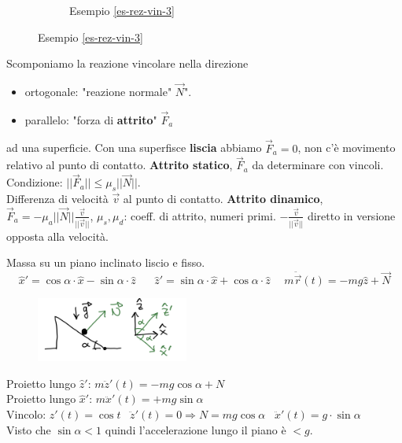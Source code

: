 \begin{figure}[h!]
\begin{subfigure}[b]{0.25\textwidth}
        \caption*{Esempio \ref{es-rez-vin-3}}
    \end{subfigure}
\end{figure}
\hspace{-15pt}Scomponiamo la reazione vincolare nella direzione
\begin{itemize}
    \item ortogonale: "reazione normale" $\vec{N}$".
    \item parallelo: "forza di \textbf{attrito}" $\vec{F}_a$
\end{itemize}
ad una superficie. Con una superfisce \textbf{liscia} abbiamo $\vec{F}_a = 0$, non c'è
movimento relativo al punto di contatto. \textbf{Attrito statico}, $\vec{F}_a$ da determinare con vincoli. Condizione: $||\vec{F}_a|| \leq \mu_s ||\vec{N}||$.\\
Differenza di velocità $\vec{v}$ al punto di contatto. \textbf{Attrito dinamico}, $\vec{F}_a = -\mu_a ||\vec{N}||\frac{\vec{v}}{||\vec{v}||}$, $\mu_s, \mu_d$: coeff. di attrito, numeri primi.
$-\frac{\vec{v}}{||\vec{v}||}$ diretto in versione opposta alla velocità.

\begin{example}
    Massa su un piano inclinato liscio e fisso.
    $$\hat{x}' = \cos\alpha \cdot \hat{x} - \sin\alpha \cdot \hat{z} \hspace{20pt}\hat{z}' = \sin\alpha \cdot \hat{x} + \cos\alpha \cdot \hat{z} \hspace{15pt} m\ddot{\vec{r}}(t) = -mg\hat{z} + \vec{N}$$
    \begin{figure}
        \vspace{-15pt}
        \centering
        \includegraphics[width=5cm]{images/esempio-reazione-vincolare-4.png}
    \end{figure}
    
    \hspace{-15pt}Proietto lungo $\hat{z}'$: \hspace{15pt} $m\ddot{z}'(t) = -mg\cos\alpha + N$\\
    Proietto lungo $\hat{x}'$: \hspace{15pt} $m\ddot{x}'(t) = +mg\sin\alpha$\\
    Vincolo: $z'(t) = \cos t \hspace{10pt} \ddot{z}'(t) = 0 \Rightarrow N = mg\cos\alpha \hspace{10pt} \ddot{x}'(t) = g \cdot \sin\alpha$\\
    Visto che $\sin\alpha < 1$ quindi l'accelerazione lungo il piano è $< g$.
\end{example}

